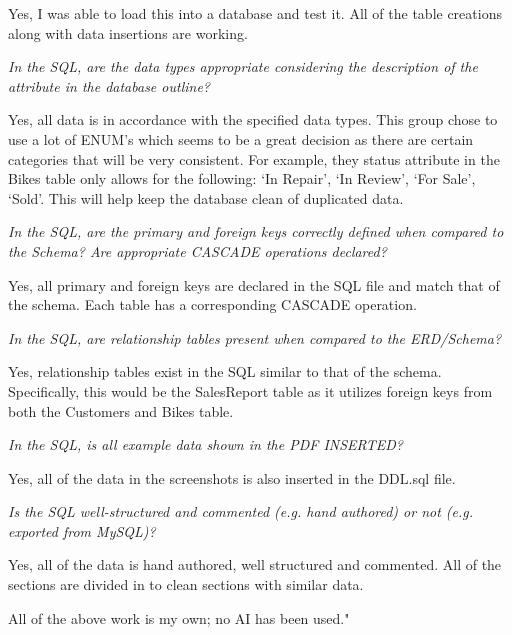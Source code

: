 \documentclass{article}
\begin{document}
\begin{tcolorbox}[colback=secondarycolor, colframe=primarycolor, title=\textbf{Step 2: Peer Review 1 - Joseph Gilmore}]
\vspace{0.2cm}
Yes, I was able to load this into a database and test it. All of the table creations along with data insertions are working.

\vspace{0.2cm}
\textit{In the SQL, are the data types appropriate considering the description of the attribute in the database outline?}

\vspace{0.2cm}
Yes, all data is in accordance with the specified data types. This group chose to use a lot of ENUM's which seems to be a great decision as there are certain categories that will be very consistent. For example, they status attribute in the Bikes table only allows for the following: `In Repair', `In Review', `For Sale', `Sold'. This will help keep the database clean of duplicated data.

\vspace{0.2cm}
\textit{In the SQL, are the primary and foreign keys correctly defined when compared to the Schema? Are appropriate CASCADE operations declared?}

\vspace{0.2cm}
Yes, all primary and foreign keys are declared in the SQL file and match that of the schema. Each table has a corresponding CASCADE operation. 

\vspace{0.2cm}
\textit{In the SQL, are relationship tables present when compared to the ERD/Schema?}

\vspace{0.2cm}
Yes, relationship tables exist in the SQL similar to that of the schema. Specifically, this would be the SalesReport table as it utilizes foreign keys from both the Customers and Bikes table.

\vspace{0.2cm}
\textit{In the SQL, is all example data shown in the PDF INSERTED?}

\vspace{0.2cm}
Yes, all of the data in the screenshots is also inserted in the DDL.sql file.

\vspace{0.2cm}
\textit{Is the SQL well-structured and commented (e.g. hand authored) or not (e.g. exported from MySQL)?}

\vspace{0.2cm}
Yes, all of the data is hand authored, well structured and commented. All of the sections are divided in to clean sections with similar data.
 
\vspace{0.2cm}
All of the above work is my own; no AI has been used."

\end{tcolorbox}
\end{document}
